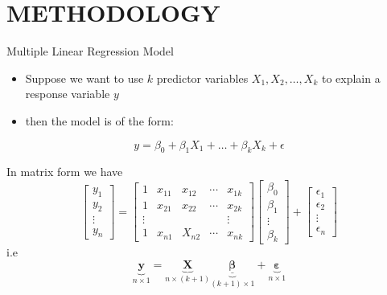\documentclass{beamer}
\numberwithin{equation}{section}
\numberwithin{table}{section}
\begin{document}
\section{METHODOLOGY}
\begin{frame}{Multiple Linear Regression Model}
	\begin{itemize}
		\item  Suppose we want to use $k$ predictor variables $X_1, X_2, \ldots, X_k$ to explain a response variable $y$\\
\item   then the model is of the form:
	\end{itemize}
\begin{equation}
	y=\beta_0+\beta_1 X_1+\ldots+\beta_k X_k+\epsilon
	\label{eq:methodology_eq1}
\end{equation}
\end{frame}
\begin{frame}
In matrix form we have
$$
\left[\begin{array}{c}
	y_1 \\
	y_2 \\
	\vdots \\
	y_n
\end{array}\right]=\left[\begin{array}{ccccc}
	1 & x_{11} & x_{12} & \cdots & x_{1 k} \\
	1 & x_{21} & x_{22} & \cdots & x_{2 k} \\
	\vdots & & & & \vdots \\
	1 & x_{n 1} & X_{n 2} & \cdots & x_{n k}
\end{array}\right]\left[\begin{array}{c}
	\beta_0 \\
	\beta_1 \\
	\vdots \\
	\beta_k
\end{array}\right]+\left[\begin{array}{c}
	\epsilon_1 \\
	\epsilon_2 \\
	\vdots \\
	\epsilon_n
\end{array}\right]
$$
i.e
\begin{equation}
	\underbrace{\mathbf{y}}_{n \times 1}=\underbrace{\mathbf{X}}_{n \times(k+1)} \underbrace{\underline{\boldsymbol{\beta}}}_{(k+1) \times 1}+\underbrace{\boldsymbol{\varepsilon}}_{n \times 1}
\end{equation}
\end{frame}
\end{document}
